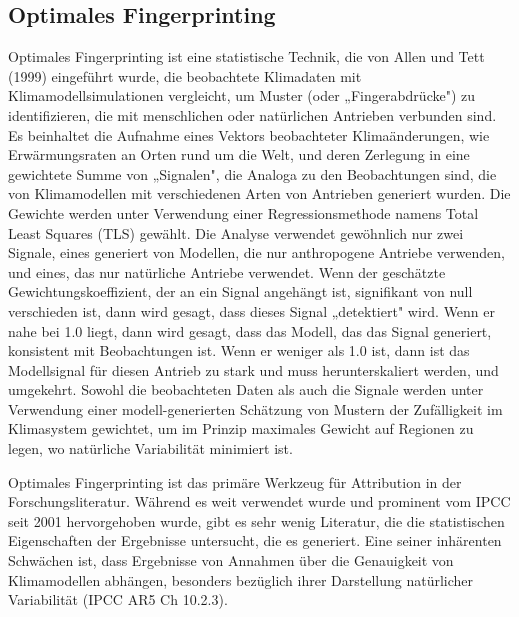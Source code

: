 \documentclass[12pt,paper=a4,DIV=12,parskip=never,chapterprefix=false,headings=standardclasses]{scrreprt}
\begin{document}
\subsection{Optimales Fingerprinting}
Optimales Fingerprinting ist eine statistische Technik, die von Allen und Tett (1999) eingeführt wurde, die beobachtete Klimadaten mit Klimamodellsimulationen vergleicht, um Muster (oder „Fingerabdrücke") zu identifizieren, die mit menschlichen oder natürlichen Antrieben verbunden sind. Es beinhaltet die Aufnahme eines Vektors beobachteter Klimaänderungen, wie Erwärmungsraten an Orten rund um die Welt, und deren Zerlegung in eine gewichtete Summe von „Signalen", die Analoga zu den Beobachtungen sind, die von Klimamodellen mit verschiedenen Arten von Antrieben generiert wurden. Die Gewichte werden unter Verwendung einer Regressionsmethode namens Total Least Squares (TLS) gewählt. Die Analyse verwendet gewöhnlich nur zwei Signale, eines generiert von Modellen, die nur anthropogene Antriebe verwenden, und eines, das nur natürliche Antriebe verwendet. Wenn der geschätzte Gewichtungskoeffizient, der an ein Signal angehängt ist, signifikant von null verschieden ist, dann wird gesagt, dass dieses Signal „detektiert" wird. Wenn er nahe bei 1.0 liegt, dann wird gesagt, dass das Modell, das das Signal generiert, konsistent mit Beobachtungen ist. Wenn er weniger als 1.0 ist, dann ist das Modellsignal für diesen Antrieb zu stark und muss herunterskaliert werden, und umgekehrt. Sowohl die beobachteten Daten als auch die Signale werden unter Verwendung einer modell-generierten Schätzung von Mustern der Zufälligkeit im Klimasystem gewichtet, um im Prinzip maximales Gewicht auf Regionen zu legen, wo natürliche Variabilität minimiert ist.

Optimales Fingerprinting ist das primäre Werkzeug für Attribution in der Forschungsliteratur. Während es weit verwendet wurde und prominent vom IPCC seit 2001 hervorgehoben wurde, gibt es sehr wenig Literatur, die die statistischen Eigenschaften der Ergebnisse untersucht, die es generiert. Eine seiner inhärenten Schwächen ist, dass Ergebnisse von Annahmen über die Genauigkeit von Klimamodellen abhängen, besonders bezüglich ihrer Darstellung natürlicher Variabilität (IPCC AR5 Ch 10.2.3).
\end{document}
